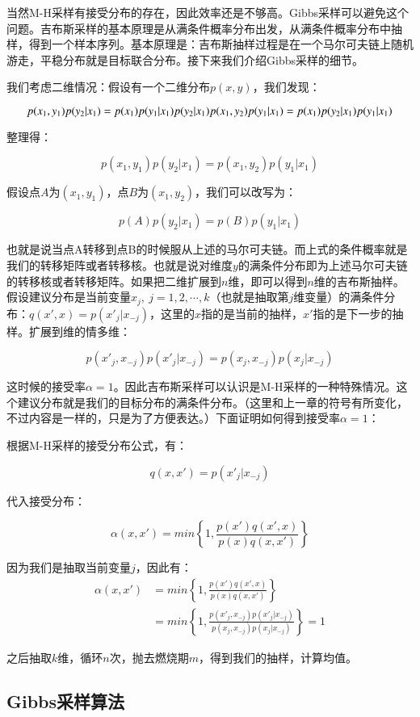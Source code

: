 当然M-H采样有接受分布的存在，因此效率还是不够高。Gibbs采样可以避免这个问题。吉布斯采样的基本原理是从满条件概率分布出发，从满条件概率分布中抽样，得到一个样本序列。基本原理是：吉布斯抽样过程是在一个马尔可夫链上随机游走，平稳分布就是目标联合分布。接下来我们介绍Gibbs采样的细节。

我们考虑二维情况：假设有一个二维分布\(p(x,y)\)，我们发现：

\[p(x_1,y_1)p(y_2|x_1)=p(x_1)p(y_1|x_1)p(y_2|x_1) \\
p(x_1,y_2)p(y_1|x_1)=p(x_1)p(y_2|x_1)p(y_1|x_1)\]

整理得：

\[p(x_1,y_1)p(y_2|x_1)=p(x_1,y_2)p(y_1|x_1)\]

假设点\(A\)为\((x_1,y_1)\)，点\(B\)为\((x_1,y_2)\)，我们可以改写为：

\[p(A)p(y_2|x_1)=p(B)p(y_1|x_1)\]

也就是说当点A转移到点B的时候服从上述的马尔可夫链。而上式的条件概率就是我们的转移矩阵或者转移核。也就是说对维度\(y\)的满条件分布即为上述马尔可夫链的转移核或者转移矩阵。如果把二维扩展到\(n\)维，即可以得到\(n\)维的吉布斯抽样。假设建议分布是当前变量\(x_j,\ j=1,2,\cdots,k\)（也就是抽取第\(j\)维变量）的满条件分布：\(q(x',x)=p(x'_j|x_{-j})\)，这里的\(x\)指的是当前的抽样，\(x'\)指的是下一步的抽样。扩展到维的情多维：

\[p(x'_j,x_{-j})p(x'_j|x_{-j})=p(x_j,x_{-j})p(x_j|x_{-j})\]

这时候的接受率\(\alpha=1\)。因此吉布斯采样可以认识是M-H采样的一种特殊情况。这个建议分布就是我们的目标分布的满条件分布。（这里和上一章的符号有所变化，不过内容是一样的，只是为了方便表达。）下面证明如何得到接受率\(\alpha=1\)：

根据M-H采样的接受分布公式，有：

\[q(x,x')=p(x'_j|x_{-j})\]

代入接受分布：

\[\alpha(x,x')
=min\left\{ 1,\frac{p(x')q(x',x)}{p(x)q(x,x')}  \right\}\]

因为我们是抽取当前变量\(j\)，因此有：
\begin{equation}
  \begin{aligned}
    \alpha(x,x')
    &=min\left\{ 1,\frac{p(x')q(x',x)}{p(x)q(x,x')}  \right\} \\
    &=min\left\{ 1,
    \frac{p(x'_j,x_{-j})p(x'_j|x_{-j})}
    {p(x_j,x_{-j})p(x_j|x_{-j})}  \right\}=1
    \end{aligned}
\end{equation}


之后抽取\(k\)维，循环\(n\)次，抛去燃烧期\(m\)，得到我们的抽样，计算均值。
\subsection{Gibbs采样算法}

\begin{figure}
\centering
\caption{}
\end{figure}

